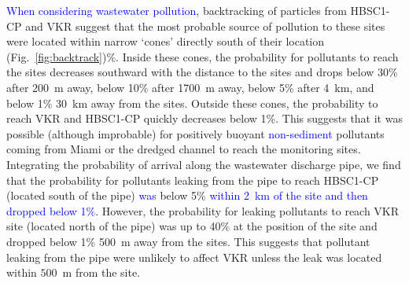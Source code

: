 \documentclass[preprint,12pt,authoryear]{elsarticle}
\newcommand{\modif}[1]{\textcolor{blue}{#1}}
\begin{document}
\modif{When considering wastewater pollution}, backtracking of particles from HBSC1-CP and VKR suggest that the most probable source of pollution to these sites were located within narrow `cones' directly south of their location (Fig.~\ref{fig:backtrack})\%. Inside these cones, the probability for pollutants to reach the sites decreases southward with the distance to the sites and drops below 30\% after 200~m away, below 10\% after 1700~m away, below 5\% after 4~km, and below 1\%  30~km away from the sites. Outside these cones, the probability to reach VKR and HBSC1-CP quickly decreases below 1\%. This suggests that it was possible (although improbable) for positively buoyant \modif{non-sediment} pollutants coming from Miami or the dredged channel to reach the monitoring sites. Integrating the probability of arrival along the wastewater discharge pipe, we find that the probability for pollutants leaking from the pipe to reach HBSC1-CP (located south of the pipe) \modif{was} below 5\% \modif{within 2~km of the site and then dropped below 1\%}. However, the probability for leaking pollutants to reach VKR site (located north of the pipe) was up to 40\% at the position of the site and dropped below 1\% 500~m away from the sites. This suggests that pollutant leaking from the pipe were unlikely to affect VKR unless the leak was located within $500$~m from the site.

\end{document}
